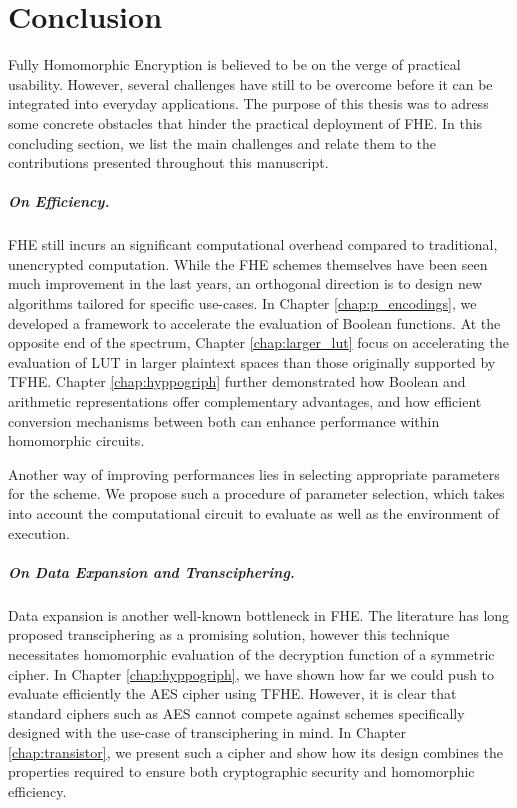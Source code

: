 \chapter*{Conclusion}

Fully Homomorphic Encryption is believed to be on the verge of practical usability. However, several challenges have still to be overcome before it can be integrated into everyday applications. The purpose of this thesis was to adress some concrete obstacles that hinder the practical deployment of \gls{FHE}. In this concluding section, we list the main challenges and relate them to the contributions presented throughout this manuscript.


\paragraph{On Efficiency.}

\gls{FHE} still incurs an significant computational overhead compared to traditional, unencrypted computation. While the \gls{FHE} schemes themselves have been seen much improvement in the last years, an orthogonal direction is to design new algorithms tailored for specific use-cases. In Chapter \ref{chap:p_encodings}, we developed a framework to accelerate the evaluation of Boolean functions. At the opposite end of the spectrum, Chapter \ref{chap:larger_lut} focus on accelerating the evaluation of \gls{LUT} in larger plaintext spaces than those originally supported by \gls{TFHE}. Chapter \ref{chap:hyppogriph} further demonstrated how Boolean and arithmetic representations offer complementary advantages, and how efficient conversion mechanisms between both can enhance performance within homomorphic circuits. 

Another way of improving performances lies in selecting appropriate parameters for the scheme. We propose such a procedure of parameter selection, which takes into account the computational circuit to evaluate as well as the environment of execution.


\paragraph{On Data Expansion and Transciphering.}


Data expansion is another well-known bottleneck in \gls{FHE}. The literature has long proposed transciphering as a promising solution, however this technique necessitates homomorphic evaluation of the decryption function of a symmetric cipher. In Chapter \ref{chap:hyppogriph}, we have shown how far we could push to evaluate efficiently the \gls{AES} cipher using \gls{TFHE}. However, it is clear that standard ciphers such as \gls{AES} cannot compete against schemes specifically designed with the use-case of transciphering in mind. In Chapter \ref{chap:transistor}, we present such a cipher and show how its design combines the properties required to ensure both cryptographic security and homomorphic efficiency. 




